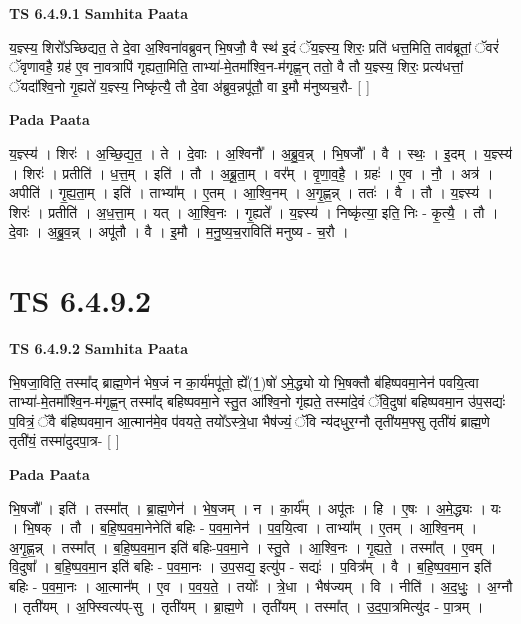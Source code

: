 \documentclass[17pt]{extarticle}
\begin{document}
\textbf{TS 6.4.9.1 } \newline
\textbf{Samhita Paata} \newline

य॒ज्ञ्स्य॒ शिरो᳚ऽच्छिद्यत॒ ते दे॒वा अ॒श्विना॑वब्रुवन् भि॒षजौ॒ वै स्थ॑ इ॒दं ॅय॒ज्ञ्स्य॒ शिरः॒ प्रति॑ धत्त॒मिति॒ ताव॑ब्रूतां॒ ॅवरं॑ ॅवृणावहै॒ ग्रह॑ ए॒व ना॒वत्रापि॑ गृह्यता॒मिति॒ ताभ्या॑-मे॒तमा᳚श्वि॒न-म॑गृह्ण॒न् ततो॒ वै तौ य॒ज्ञ्स्य॒ शिरः॒ प्रत्य॑धत्तां॒ ॅयदा᳚श्वि॒नो गृ॒ह्यते॑ य॒ज्ञ्स्य॒ निष्कृ॑त्यै॒ तौ दे॒वा अ॑ब्रुव॒न्नपू॑तौ॒ वा इ॒मौ म॑नुष्यच॒रौ- [  ] \newline

\textbf{Pada Paata} \newline

य॒ज्ञ्स्य॑ । शिरः॑ । अ॒च्छि॒द्य॒त॒ । ते । दे॒वाः । अ॒श्विनौ᳚ । अ॒ब्रु॒व॒न्न् । भि॒षजौ᳚ । वै । स्थः॒ । इ॒दम् । य॒ज्ञ्स्य॑ । शिरः॑ । प्रतीति॑ । ध॒त्त॒म् । इति॑ । तौ । अ॒ब्रू॒ता॒म् । वर᳚म् । वृ॒णा॒व॒है॒ । ग्रहः॑ । ए॒व । नौ॒ । अत्र॑ । अपीति॑ । गृ॒ह्य॒ता॒म् । इति॑ । ताभ्या᳚म् । ए॒तम् । आ॒श्वि॒नम् । अ॒गृ॒ह्ण॒न्न् । ततः॑ । वै । तौ । य॒ज्ञ्स्य॑ । शिरः॑ । प्रतीति॑ । अ॒ध॒त्ता॒म् । यत् । आ॒श्वि॒नः । गृ॒ह्यते᳚ । य॒ज्ञ्स्य॑ । निष्कृ॑त्या॒ इति॒ निः - कृ॒त्यै॒ । तौ । दे॒वाः । अ॒ब्रु॒व॒न्न् । अपू॑तौ । वै । इ॒मौ । म॒नु॒ष्य॒च॒राविति॑ मनुष्य - च॒रौ ।  \newline




\section*{ TS 6.4.9.2 }

\textbf{TS 6.4.9.2 } \newline
\textbf{Samhita Paata} \newline

भि॒षजा॒विति॒ तस्मा᳚द् ब्राह्म॒णेन॑ भेष॒जं न का॒र्य॑मपू॑तो॒ ह्ये᳚(1॒)षो॑ ऽमे॒द्ध्यो यो भि॒षक्तौ ब॑हिष्पवमा॒नेन॑ पवयि॒त्वा ताभ्या॑-मे॒तमा᳚श्वि॒न-म॑गृह्ण॒न् तस्मा᳚द् बहिष्पवमा॒ने स्तु॒त आ᳚श्वि॒नो गृ॑ह्यते॒ तस्मा॑दे॒वं ॅवि॒दुषा॑ बहिष्पवमा॒न उ॑प॒सद्यः॑ प॒वित्रं॒ ॅवै ब॑हिष्पवमा॒न आ॒त्मान॑मे॒व प॑वयते॒ तयो᳚ऽस्त्रे॒धा भैष॑ज्यं॒ ॅवि न्य॑दधुर॒ग्नौ तृती॑यम॒फ्सु तृती॑यं ब्राह्म॒णे तृती॑यं॒ तस्मा॑दुदपा॒त्र- [  ] \newline

\textbf{Pada Paata} \newline

भि॒षजौ᳚ । इति॑ । तस्मा᳚त् । ब्रा॒ह्म॒णेन॑ । भे॒ष॒जम् । न । का॒र्य᳚म् । अपू॑तः । हि । ए॒षः । अ॒मे॒द्ध्यः । यः । भि॒षक् । तौ । ब॒हि॒ष्प॒व॒मा॒नेनेति॑ बहिः - प॒व॒मा॒नेन॑ । प॒व॒यि॒त्वा । ताभ्या᳚म् । ए॒तम् । आ॒श्वि॒नम् । अ॒गृ॒ह्ण॒न्न् । तस्मा᳚त् । ब॒हि॒ष्प॒व॒मा॒न इति॑ बहिः-प॒व॒मा॒ने । स्तु॒ते । आ॒श्वि॒नः । गृ॒ह्य॒ते॒ । तस्मा᳚त् । ए॒वम् । वि॒दुषा᳚ । ब॒हि॒ष्प॒व॒मा॒न इति॑ बहिः - प॒व॒मा॒नः । उ॒प॒सद्य॒ इत्यु॑प - सद्यः॑ । प॒वित्र᳚म् । वै । ब॒हि॒ष्प॒व॒मा॒न इति॑ बहिः - प॒व॒मा॒नः । आ॒त्मान᳚म् । ए॒व । प॒व॒य॒ते॒ । तयोः᳚ । त्रे॒धा । भैष॑ज्यम् । वि । नीति॑ । अ॒द॒धुः॒ । अ॒ग्नौ । तृती॑यम् । अ॒फ्स्वित्य॑प्-सु । तृती॑यम् । ब्रा॒ह्म॒णे । तृती॑यम् । तस्मा᳚त् । उ॒द॒पा॒त्रमित्यु॑द - पा॒त्रम् ।  \newline
\end{document}
